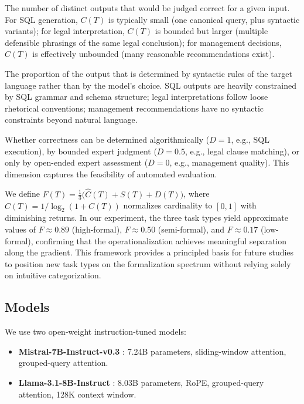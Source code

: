 \documentclass[runningheads]{llncs}
\begin{document}
\begin{description}[noitemsep,style=nextline]
  \item[Output-space cardinality $C(T)$.]
    The number of distinct outputs that would be judged correct for a given input. For SQL generation, $C(T)$ is typically small (one canonical query, plus syntactic variants); for legal interpretation, $C(T)$ is bounded but larger (multiple defensible phrasings of the same legal conclusion); for management decisions, $C(T)$ is effectively unbounded (many reasonable recommendations exist).

  \item[Syntactic constraint density $S(T)$.]
    The proportion of the output that is determined by syntactic rules of the target language rather than by the model's choice. SQL outputs are heavily constrained by SQL grammar and schema structure; legal interpretations follow loose rhetorical conventions; management recommendations have no syntactic constraints beyond natural language.

  \item[Evaluation decidability $D(T)$.]
    Whether correctness can be determined algorithmically ($D = 1$, e.g., SQL execution), by bounded expert judgment ($D = 0.5$, e.g., legal clause matching), or only by open-ended expert assessment ($D = 0$, e.g., management quality). This dimension captures the feasibility of automated evaluation.
\end{description}

\noindent We define $F(T) = \frac{1}{3}\bigl(\hat{C}(T) + S(T) + D(T)\bigr)$, where $\hat{C}(T) = 1 / \log_2(1 + C(T))$ normalizes cardinality to $[0, 1]$ with diminishing returns. In our experiment, the three task types yield approximate values of $F \approx 0.89$ (high-formal), $F \approx 0.50$ (semi-formal), and $F \approx 0.17$ (low-formal), confirming that the operationalization achieves meaningful separation along the gradient. This framework provides a principled basis for future studies to position new task types on the formalization spectrum without relying solely on intuitive categorization.

\subsection{Models}
\label{sec:models}

We use two open-weight instruction-tuned models:

\begin{itemize}[noitemsep]
  \item \textbf{Mistral-7B-Instruct-v0.3} \cite{jiang2023mistral}: 7.24B parameters, sliding-window attention, grouped-query attention.
  \item \textbf{Llama-3.1-8B-Instruct} \cite{dubey2024llama}: 8.03B parameters, RoPE, grouped-query attention, 128K context window.
\end{itemize}
\end{document}
